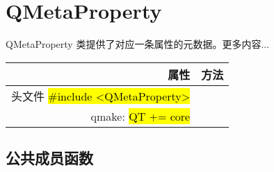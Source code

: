 \chapter{QMetaProperty}

QMetaProperty 类提供了对应一条属性的元数据。更多内容...

\begin{tabular}{|r|l|}
	\hline
	属性 & 方法 \\
	\hline
    头文件 	\hl{\#include <QMetaProperty>} \\
    \hline
    qmake: \hl{QT += core}    \\
	\hline
\end{tabular}

\section{公共成员函数}

